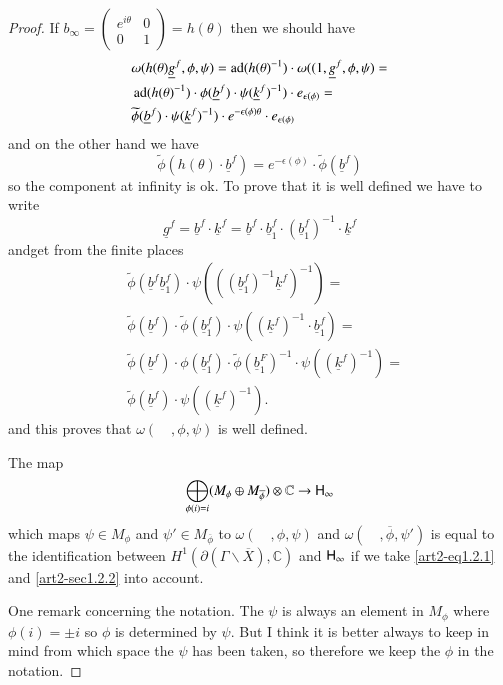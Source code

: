 \begin{proof}
If $b_{\infty}=\left(\begin{matrix} e^{i\theta} & 0\\ 0 & 1\end{matrix}\right)=h(\theta)$ then we should have
\begin{align*}
& \omega(h(\theta)\underline{g}^{f},\phi,\psi)=\operatorname{ad}(h(\theta)^{-1})\cdot \omega((1,\underline{g}^{f},\phi,\psi)=\\
& \operatorname{ad}(h(\theta)^{-1})\cdot \phi(\underline{b}^{f})\cdot \psi(\underline{k}^{f})^{-1})\cdot e_{\epsilon(\phi)}=\\
& \widetilde{\phi}(\underline{b}^{f})\cdot \psi(\underline{k}^{f})^{-1})\cdot e^{-\epsilon(\phi)\theta}\cdot e_{\epsilon(\phi)}
\end{align*}
and on the other hand we have
$$
\widetilde{\phi}(h(\theta)\cdot \underline{b}^{f})=e^{-\epsilon(\phi)}\cdot \widetilde{\phi}(\underline{b}^{f})
$$
so the component at infinity is ok. To prove that it is well defined we have to write
$$
\underline{g}^{f}=\underline{b}^{f}\cdot \underline{k}^{f}=\underline{b}^{f}\cdot \underline{b}^{f}_{1}\cdot (\underline{b}^{f}_{1})^{-1}\cdot \underline{k}^{f}
$$
and\pageoriginale get from the finite places
\begin{align*}
& \widetilde{\phi}(\underline{b}^{f}\underline{b}^{f}_{1})\cdot \psi(((\underline{b}^{f}_{1})^{-1}\underline{k}^{f})^{-1})=\\
& \widetilde{\phi}(\underline{b}^{f})\cdot \widetilde{\phi}(\underline{b}^{f}_{1})\cdot \psi((\underline{k}^{f})^{-1}\cdot \underline{b}^{f}_{1})=\\
& \widetilde{\phi}(\underline{b}^{f})\cdot \phi(\underline{b}^{f}_{1})\cdot \widetilde{\phi}(\underline{b}^{F}_{1})^{-1}\cdot \psi((\underline{k}^{f})^{-1})=\\
&\widetilde{\phi}(\underline{b}^{f})\cdot \psi((\underline{k}^{f})^{-1}).
\end{align*}
and this proves that $\omega(\quad,\phi,\psi)$ is well defined.

The map
$$
\bigoplus\limits_{\phi(i)=i}(M_{\phi}\oplus M_{\overline{\phi}})\otimes \mathbb{C}\to \mathsf{H}_{\infty}
$$
which maps $\psi\in M_{\phi}$ and $\psi'\in M_{\overline{\phi}}$ to $\omega(\quad,\phi,\psi)$ and $\omega(\quad,\overline{\phi},\psi')$ is equal to the identification between $H^{1}(\partial(\Gamma\backslash\overline{X}),\mathbb{C})$ and $\mathsf{H}_{\infty}$ if we take \eqref{art2-eq1.2.1} and \eqref{art2-sec1.2.2} into account.

One remark concerning the notation. The $\psi$ is always an element in $M_{\phi}$ where $\phi(i)=\pm i$ so $\phi$ is determined by $\psi$. But I think it is better always to keep in mind from which space the $\psi$ has been taken, so therefore we keep the $\phi$ in the notation.
\end{proof}

